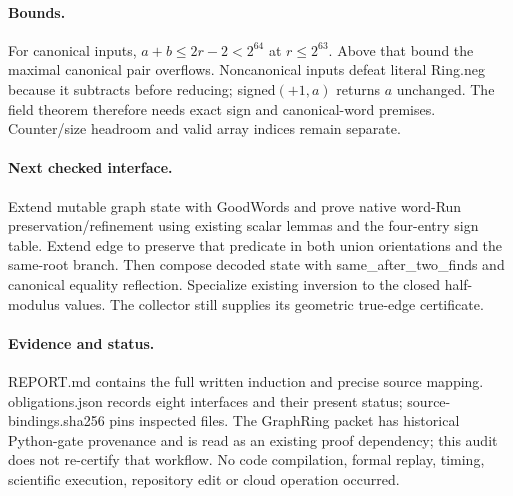\documentclass[10pt]{article}
\begin{document}
\paragraph{Bounds.}
For canonical inputs, $a+b\leq2r-2<2^{64}$ at $r\leq2^{63}$. Above that bound the maximal canonical pair overflows. Noncanonical inputs defeat literal Ring.neg because it subtracts before reducing; signed$(+1,a)$ returns $a$ unchanged. The field theorem therefore needs exact sign and canonical-word premises. Counter/size headroom and valid array indices remain separate.

\paragraph{Next checked interface.}
Extend mutable graph state with GoodWords and prove native word-Run preservation/refinement using existing scalar lemmas and the four-entry sign table. Extend edge to preserve that predicate in both union orientations and the same-root branch. Then compose decoded state with same\_after\_two\_finds and canonical equality reflection. Specialize existing inversion to the closed half-modulus values. The collector still supplies its geometric true-edge certificate.

\paragraph{Evidence and status.}
REPORT.md contains the full written induction and precise source mapping. obligations.json records eight interfaces and their present status; source-bindings.sha256 pins inspected files. The GraphRing packet has historical Python-gate provenance and is read as an existing proof dependency; this audit does not re-certify that workflow. No code compilation, formal replay, timing, scientific execution, repository edit or cloud operation occurred.
\end{document}
